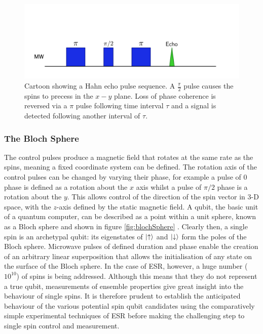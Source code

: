 \begin{figure}
\centering
\includegraphics[width = \columnwidth]{Figures/hahnEcho.pdf}
\caption[Hahn echo sequence]{Cartoon showing a Hahn echo pulse sequence. A $\frac{\pi}{2}$ pulse causes the spins to precess in the $x-y$ plane. Loss of phase coherence is reversed via a $\pi$ pulse following time interval $\tau$ and a signal is detected following another interval of $\tau$.}
\label{fig:HahnEcho}
\end{figure}


\subsubsection{The Bloch Sphere}

The control pulses produce a magnetic field that rotates at the same rate as the spins, meaning a fixed coordinate system can be defined.
The rotation axis of the control pulses can be changed by varying their phase, for example a pulse of 0 phase is defined as a rotation about the $x$ axis whilst a pulse of $\pi/2$ phase is a rotation about the $y$.
This allows control of the direction of the spin vector in 3-D space, with the $z$-axis defined by the static magnetic field.  
A qubit, the basic unit of a quantum computer, can be described as a point within a unit sphere, known as a Bloch sphere and shown in figure \ref{fig:blochSphere} \cite{Nielsen:2011:QCQ:1972505}.
Clearly then, a single spin is an archetypal qubit: its eigenstates of $\ket{\uparrow}$ and $\ket{\downarrow}$ form the poles of the Bloch sphere. 
Microwave pulses of defined duration and phase enable the creation of an arbitrary linear superposition that allows the initialisation of any state on the surface of the Bloch sphere.
In the case of ESR, however, a huge number ($10^{10}$) of spins is being addressed. 
Although this means that they do not represent a true qubit, measurements of ensemble properties give great insight into the behaviour of single spins.
It is therefore prudent to establish the anticipated behaviour of the various potential spin qubit candidates using the comparatively simple experimental techniques of ESR before making the challenging step to single spin control and measurement. 

